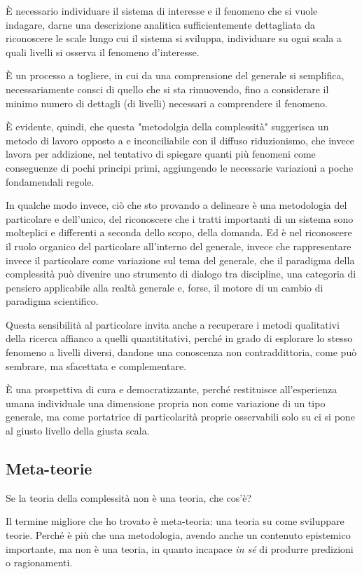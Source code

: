 \documentclass[a4paper, headings=standardclasses]{scrartcl}
\begin{document}
È necessario individuare il sistema di interesse e il fenomeno che si vuole indagare, darne una descrizione analitica sufficientemente dettagliata da riconoscere le scale lungo cui il sistema si sviluppa, individuare su ogni scala a quali livelli si osserva il fenomeno d'interesse.

È un processo a togliere, in cui da una comprensione del generale si semplifica, necessariamente consci di quello che si sta rimuovendo, fino a considerare il minimo numero di dettagli (di livelli) necessari a comprendere il fenomeno.

È evidente, quindi, che questa "metodolgia della complessità" suggerisca un metodo di lavoro opposto a e inconciliabile con il diffuso riduzionismo, che invece lavora per addizione, nel tentativo di spiegare quanti più fenomeni come conseguenze di pochi principi primi, aggiungendo le necessarie variazioni a poche fondamendali regole.

In qualche modo invece, ciò che sto provando a delineare è una metodologia del particolare e dell'unico, del riconoscere che i tratti importanti di un sistema sono molteplici e differenti a seconda dello scopo, della domanda. Ed è nel riconoscere il ruolo organico del particolare all'interno del generale, invece che rappresentare invece il particolare come variazione sul tema del generale, che il paradigma della complessità può divenire uno strumento di dialogo tra discipline, una categoria di pensiero applicabile alla realtà generale e, forse, il motore di un cambio di paradigma scientifico.

Questa sensibilità al particolare invita anche a recuperare i metodi qualitativi della ricerca affianco a quelli quantititativi, perché in grado di esplorare lo stesso fenomeno a livelli diversi, dandone una conoscenza non contraddittoria, come può sembrare, ma sfacettata e complementare.

È una prospettiva di cura e democratizzante, perché restituisce all'esperienza umana individuale una dimensione propria non come variazione di un tipo generale, ma come portatrice di particolarità proprie osservabili solo su ci si pone al giusto livello della giusta scala.

\subsection{Meta-teorie}
Se la teoria della complessità non è una teoria, che cos'è?

Il termine migliore che ho trovato è meta-teoria: una teoria su come sviluppare teorie. Perché è più che una metodologia, avendo anche un contenuto epistemico importante, ma non è una teoria, in quanto incapace \textit{in sé} di produrre predizioni o ragionamenti.
\end{document}

